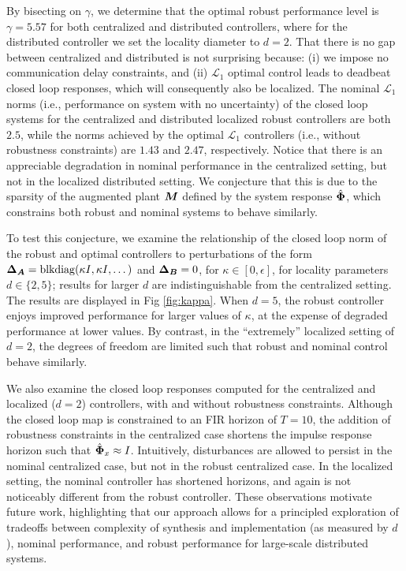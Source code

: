 By bisecting on $\gamma$, we determine that the optimal robust performance level is $\gamma = 5.57$ for both centralized and distributed controllers, where for the distributed controller we set the locality diameter to $d=2$.  That there is no gap between centralized and distributed is not surprising because: (i) we impose no communication delay constraints, and (ii) $\mathcal{L}_1$ optimal control leads to deadbeat closed loop responses, which will consequently also be localized.  The nominal $\mathcal{L}_1$ norms  (i.e., performance on system with no uncertainty) of the closed loop systems for the centralized and distributed localized robust controllers are both $2.5$, while the norms achieved by the optimal $\mathcal{L}_1$ controllers (i.e., without robustness constraints) are $1.43$ and $2.47$, respectively.  Notice that there is an appreciable degradation in nominal performance in the centralized setting, but not in the localized distributed setting.  We conjecture that this is due to the sparsity of the augmented plant $\boldsymbol{M}$ defined by the system response $\hat{\boldsymbol{\Phi}}$, which constrains both robust and nominal systems to behave similarly.

To test this conjecture, we examine the relationship of the closed loop norm of the robust and optimal controllers to perturbations of the form ${\boldsymbol{\Delta}}_{\boldsymbol{A}} = \mathrm{blkdiag}(\kappa I, \kappa I, \dots)$ and ${\boldsymbol{\Delta}}_{\boldsymbol{B}} = 0$, for $\kappa \in [0,\epsilon]$, for locality parameters $d\in\{2,5\}$; results for larger $d$ are indistinguishable from the centralized setting. The results are displayed in Fig \ref{fig:kappa}.  When $d=5$, the robust controller enjoys improved performance for larger values of $\kappa$, at the expense of degraded performance at lower values. By contrast, in the ``extremely'' localized setting of $d=2$, the degrees of freedom are limited such that robust and nominal control behave similarly.  

We also examine the closed loop responses computed for the centralized and localized ($d=2$) controllers, with and without robustness constraints. Although the closed loop map is constrained to an FIR horizon of $T=10$, the addition of robustness constraints in the centralized case shortens the impulse response horizon such that $\hat{\boldsymbol{\Phi}}_x \approx I$. Intuitively, disturbances are allowed to persist in the nominal centralized case, but not in the robust centralized case. In the localized setting, the nominal controller has shortened horizons, and again is not noticeably different from the robust controller. These observations motivate future work, highlighting that our approach allows for a principled exploration of tradeoffs between complexity of synthesis and implementation (as measured by $d$), nominal performance, and robust performance for large-scale distributed systems.

